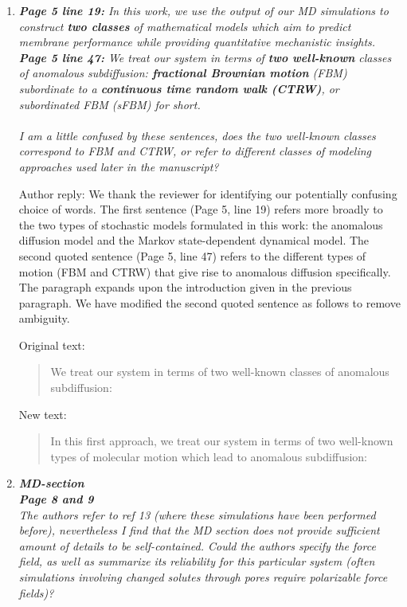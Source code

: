 \documentclass{article}
\begin{document}
\begin{enumerate}[label={Comment \theenumi :}, leftmargin=3.9\parindent]

  \item \textit{\textbf{Page 5 line 19:} In this work, we use the output of our MD simulations
        to construct \textbf{two classes} of mathematical models which aim to predict membrane 
        performance while providing quantitative mechanistic insights. \\
        \textbf{Page 5 line 47:} We treat our system in terms of \textbf{two well-known} classes of 
        anomalous subdiffusion: \textbf{fractional Brownian motion} (FBM) subordinate to a 
        \textbf{continuous time random walk (CTRW)}, or subordinated FBM (sFBM) for short. \\ \\
        I am a little confused by these sentences, does the two well-known classes correspond to FBM
        and CTRW, or refer to different classes of modeling approaches used later in the manuscript?}
    
  Author reply: We thank the reviewer for identifying our potentially confusing choice of words.
  The first sentence (Page 5, line 19) refers more broadly to the two types of stochastic models 
  formulated in this work: the anomalous diffusion model and the Markov state-dependent dynamical
  model. The second quoted sentence (Page 5, line 47) refers to the different types of
  motion (FBM and CTRW) that give rise to anomalous diffusion specifically. The paragraph expands
  upon the introduction given in the previous paragraph. We have modified the second quoted 
  sentence as follows to remove ambiguity.
  
  Original text:
  \begin{quote}
  We treat our system in terms of two well-known classes of anomalous subdiffusion: 
  \end{quote}
  
  New text:
  \begin{quote}
  In this first approach, we treat our system in terms of two well-known types of molecular
  motion which lead to anomalous subdiffusion: 
  \end{quote}
  
  \item \textit{\textbf{MD-section} \\
        \textbf{Page 8 and 9} \\
        The authors refer to ref 13 (where these simulations have been performed before), 
        nevertheless I find that the MD section does not provide sufficient amount of details 
        to be self-contained. Could the authors specify the force field, as well as summarize 
        its reliability for this particular system (often simulations involving changed solutes
        through pores require polarizable force fields)?
   }
        

\end{enumerate}
\end{document}
